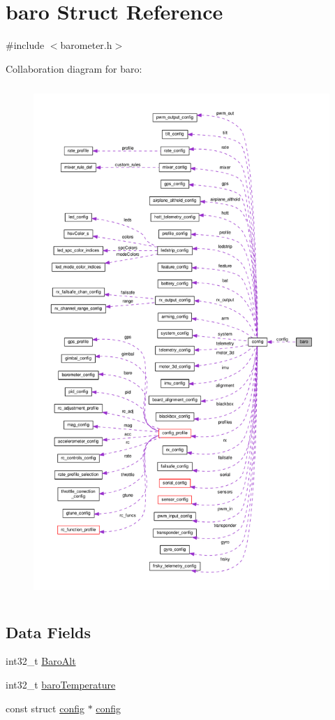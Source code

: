 \hypertarget{structbaro}{\section{baro Struct Reference}
\label{structbaro}
}


{\ttfamily \#include $<$barometer.\+h$>$}



Collaboration diagram for baro\+:\nopagebreak
\begin{figure}[H]
\begin{center}
\leavevmode
\includegraphics[height=550pt]{structbaro__coll__graph}
\end{center}
\end{figure}
\subsection*{Data Fields}
\begin{DoxyCompactItemize}
\item 
int32\+\_\+t \hyperlink{structbaro_a43c7fc33ce01819c8f62b086dd1133ae}{Baro\+Alt}
\item 
int32\+\_\+t \hyperlink{structbaro_a7c0f0f598179c4ab8a7f4a7fc0037a8f}{baro\+Temperature}
\item 
const struct \hyperlink{structconfig}{config} $\ast$ \hyperlink{structbaro_ae94e8bfca328f0e1bce56979f43231ad}{config}
\end{DoxyCompactItemize}


